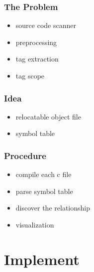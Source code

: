 

\begin{frame}[t]
	\frametitle{The Problem}
	\begin{itemize}
		\item<+-|alert@+> source code scanner
		\item<+-|alert@+> preprocessing
		\item<+-|alert@+> tag extraction
		\item<+-|alert@+> tag scope
	\end{itemize}
\end{frame}



\begin{frame}[t]
	\frametitle{Idea}
	\begin{itemize}
		\item<+-|alert@+> relocatable object file
		\item<+-|alert@+> symbol table
	\end{itemize}
\end{frame}




\begin{frame}[t]
	\frametitle{Procedure}
	\begin{itemize}
		\item<+-|alert@+> compile each c file
		\item<+-|alert@+> parse symbol table
		\item<+-|alert@+> discover the relationship
		\item<+-|alert@+> visualization
	\end{itemize}
\end{frame}


\section{Implement}


